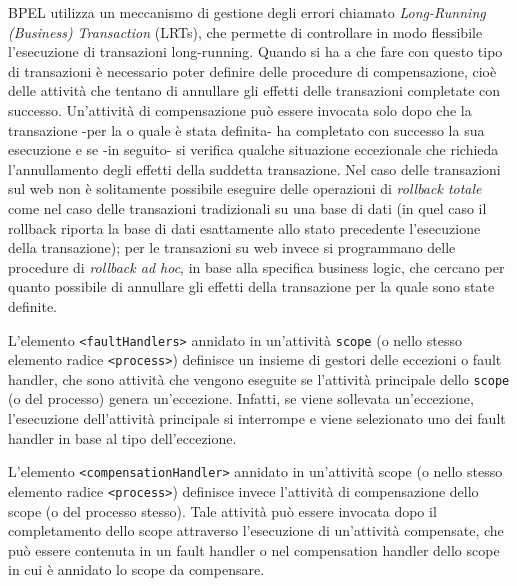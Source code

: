 BPEL utilizza un meccanismo di gestione degli errori chiamato \emph{Long-Running
(Business) Transaction} (LRTs), che permette di controllare in modo flessibile
l'esecuzione di transazioni long-running.
Quando si ha a che fare con questo tipo di transazioni è necessario poter
definire delle procedure di compensazione, cioè delle attività che tentano di
annullare gli effetti delle transazioni completate con successo. Un'attività di
compensazione può essere invocata solo dopo che la transazione -per la o
quale è stata definita- ha completato con successo la sua esecuzione e se -in
seguito- si verifica qualche situazione eccezionale che richieda l'annullamento
degli effetti della suddetta transazione. Nel caso delle transazioni sul web
non è solitamente possibile eseguire delle operazioni di \emph{rollback totale}
come nel caso delle transazioni tradizionali su una base di dati (in quel caso il
rollback riporta la base di dati esattamente allo stato precedente l'esecuzione
della transazione); per le transazioni su web invece si programmano delle
procedure di \emph{rollback ad hoc}, in base alla specifica business logic, che
cercano per quanto possibile di annullare gli effetti della transazione per la quale sono
state definite.

L'elemento \texttt{<faultHandlers>} annidato in un'attività \texttt{scope} (o
nello stesso elemento radice \texttt{<process>}) definisce un insieme di gestori
delle eccezioni o fault handler, che sono attività che vengono eseguite se
l'attività principale dello \texttt{scope} (o del processo) genera un'eccezione.
Infatti, se viene sollevata un'eccezione, l'esecuzione dell'attività principale si
interrompe e viene selezionato uno dei fault handler in base al tipo
dell'eccezione.

L'elemento \texttt{<compensationHandler>} annidato in un'attività scope (o
nello stesso elemento radice \texttt{<process>}) definisce invece l'attività di
compensazione dello scope (o del processo stesso). Tale attività può essere
invocata dopo il completamento dello scope attraverso l'esecuzione di
un'attività compensate, che può essere contenuta in un fault handler o nel
compensation handler dello scope in cui è annidato lo scope da compensare.



